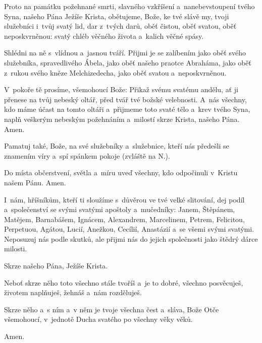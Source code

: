 Proto na památku požehnané smrti, slavného vzkříšení a~nanebevstoupení tvého Syna, našeho Pána Ježíše Krista, obětujeme, Bože, ke tvé slávě my, tvoji služebníci i~tvůj svatý lid, dar z~tvých darů, oběť čistou, oběť svatou, oběť neposkvrněnou: svatý chléb věčného života a~kalich věčné spásy.

Shlédni na ně s~vlídnou a~jasnou tváří. Přij\-mi je se zalíbením jako oběť svého služebníka, spravedlivého Ábela, jako oběť našeho praotce Abraháma, jako oběť z~rukou svého kněze Melchizedecha, jako oběť svatou a~neposkvrněnou.

V~pokoře tě prosíme, všemohoucí Bože: Přikaž svému svatému andělu, ať ji přenese na tvůj nebeský oltář, před tvář tvé božské velebnosti. A~nás všechny, kdo máme účast na tomto oltáři a~přijmeme toto svaté tělo a~krev tvého Syna, naplň veškerým nebeským požehnáním a~milostí skrze Krista, našeho Pána. Amen.

Pamatuj také, Bože, na své služebníky a~služebnice, kteří nás předešli se znamením víry a~spí spánkem pokoje (zvláště na {\color{red}N.}).

Do místa občerstvení, světla a~míru uveď všechny, kdo odpočinuli v~Kristu našem Pánu. Amen.

I~nám, hříšníkům, kteří ti sloužíme s~důvěrou ve tvé velké slitování, dej podíl a~společenství se svými svatými apoštoly a~mučedníky: Janem, Štěpánem, Matějem, Bar\-nabášem, Ignácem, Alexandrem, Marcelinem, Petrem, Felicitou, Perpetuou, Agátou, Lucií, Anež\-kou, Cecílií, Anastázií a~se všemi svými svatými. Neposuzuj nás podle skutků, ale přijmi nás do jejich společnosti jako štědrý dárce milosti.

Skrze našeho Pána, Ježíše Krista.

Neboť skrze něho toto všechno stále tvoříš a~je to dobré, všechno posvěcuješ, životem naplňuješ, žehnáš a~nám rozděluješ.

Skrze něho a~s ním a~v něm je tvoje všechna čest a~sláva, Bože Otče všemohoucí, v~jednotě Ducha svatého po všechny věky věků.

\Rbardot{} Amen.

